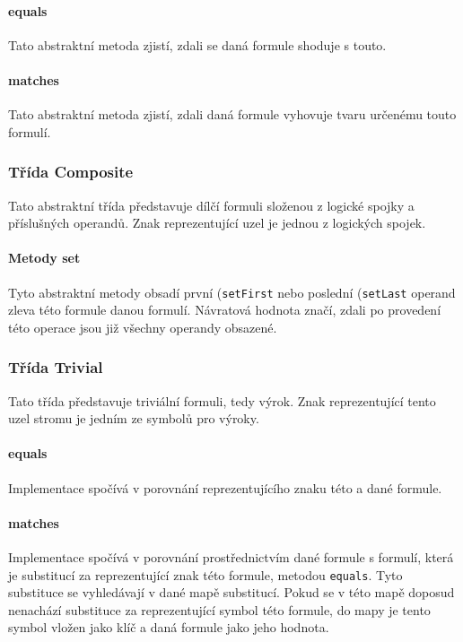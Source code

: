 \documentclass[thesis=B,czech,hidelinks]{thesis}[2012/06/26]
\begin{document}
\paragraph{equals}

Tato abstraktní metoda zjistí, zdali se daná formule shoduje s touto.

\paragraph{matches}

Tato abstraktní metoda zjistí, zdali daná formule vyhovuje tvaru určenému touto formulí.

\subsubsection{Třída Composite}

Tato abstraktní třída představuje dílčí formuli složenou z logické spojky a příslušných operandů. Znak reprezentující uzel je jednou z logických spojek.

\paragraph{Metody set}

Tyto abstraktní metody obsadí první (\texttt{setFirst} nebo poslední (\texttt{setLast} operand zleva této formule danou formulí. Návratová hodnota značí, zdali po provedení této operace jsou již všechny operandy obsazené.

\subsubsection{Třída Trivial}

Tato třída představuje triviální formuli, tedy výrok. Znak reprezentující tento uzel stromu je jedním ze symbolů pro výroky.

\paragraph{equals}

Implementace spočívá v porovnání reprezentujícího znaku této a dané formule.

\paragraph{matches}

Implementace spočívá v porovnání prostřednictvím dané formule s formulí, která je substitucí za reprezentující znak této formule, metodou \texttt{equals}. Tyto substituce se vyhledávají v dané mapě substitucí. Pokud se v této mapě doposud nenachází substituce za reprezentující symbol této formule, do mapy je tento symbol vložen jako klíč a daná formule jako jeho hodnota.
\end{document}
